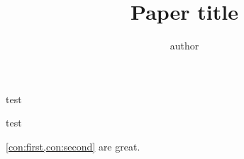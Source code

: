 \documentclass[\draftmode]{llncs}
\title{Paper title}
\date{}
\author{\vspace*{-1cm}}
\institute{\vspace*{-1cm}}
\author{
        author\inst{1}
    }
\institute{
         institute
         \email{author@email.org}
    }
\begin{document}
\mymaketitle

\begin{abstract}
    
    \keywords{}
\end{abstract}

\iffullversion
    \vspace*{-6mm}
    \mytoc
\fi
\setcounter{footnote}{0}

\begin{construction}\label{con:first}
test
\end{construction}

\begin{construction}\label{con:second}
test
\end{construction}

\cref{con:first,con:second} are great.
\textcite{C:GolMicWig86}





\printbibliography
\appendix
%
\end{document}
